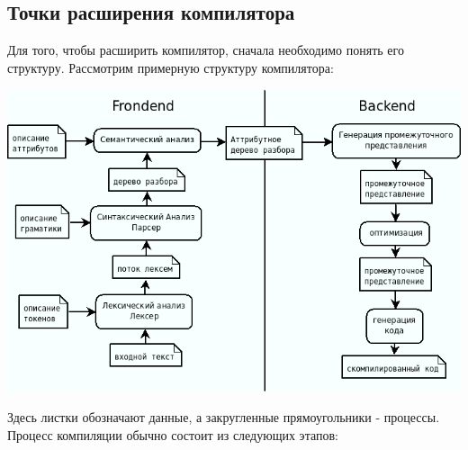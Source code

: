 \documentclass[a4paper,12pt]{article}
\begin{document}
\subsection{Точки расширения компилятора}
Для того, чтобы расширить компилятор, сначала необходимо понять его структуру.
Рассмотрим примерную структуру компилятора:
\begin{center}
 \includegraphics[scale=0.6]{img/compiler2.png}
\end{center}
Здесь листки обозначают данные, а закругленные прямоугольники - процессы.
\newline \newline
Процесс компиляции обычно состоит из следующих этапов:
\end{document}
